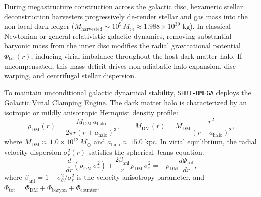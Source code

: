 \documentclass[11pt,onecolumn]{article}
\begin{document}
During megastructure construction across the galactic disc, hexameric stellar deconstruction harvesters progressively de-render stellar and gas mass into the non-local dark ledger ($M_{\text{harvested}} \sim 10^9\,M_\odot \approx 1.988 \times 10^{39}\text{ kg}$). In classical Newtonian or general-relativistic galactic dynamics, removing substantial baryonic mass from the inner disc modifies the radial gravitational potential $\Phi_{\text{tot}}(r)$, inducing virial imbalance throughout the host dark matter halo. If uncompensated, this mass deficit drives non-adiabatic halo expansion, disc warping, and centrifugal stellar dispersion.

To maintain unconditional galactic dynamical stability, \texttt{SHBT-OMEGA} deploys the Galactic Virial Clamping Engine. The dark matter halo is characterized by an isotropic or mildly anisotropic Hernquist density profile:
\begin{equation}
\rho_{\text{DM}}(r) = \frac{M_{\text{DM}} \, a_{\text{halo}}}{2\pi r (r + a_{\text{halo}})^3}, \qquad M_{\text{DM}}(r) = M_{\text{DM}} \frac{r^2}{(r + a_{\text{halo}})^2},
\label{eq:hernquist_density_mass}
\end{equation}
where $M_{\text{DM}} \approx 1.0 \times 10^{12}\,M_\odot$ and $a_{\text{halo}} \approx 15.0\text{ kpc}$. In virial equilibrium, the radial velocity dispersion $\sigma_r^2(r)$ satisfies the spherical Jeans equation:
\begin{equation}
\frac{d}{dr}\left( \rho_{\text{DM}} \, \sigma_r^2 \right) + \frac{2\beta_{\text{ani}}}{r} \rho_{\text{DM}} \, \sigma_r^2 = -\rho_{\text{DM}} \frac{d\Phi_{\text{tot}}}{dr},
\label{eq:jeans_virial_equation}
\end{equation}
where $\beta_{\text{ani}} = 1 - \sigma_\theta^2/\sigma_r^2$ is the velocity anisotropy parameter, and $\Phi_{\text{tot}} = \Phi_{\text{DM}} + \Phi_{\text{baryon}} + \Phi_{\text{counter}}$.
\end{document}
